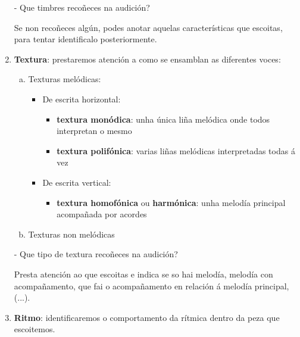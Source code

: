 \begin{enumerate}[1.-]
        \par %
        - Que timbres recoñeces na audición? \dotfill
        \par %
        Se non recoñeces algún, podes anotar aquelas características que escoitas, para tentar identificalo posteriormente.
        \item %
        \textbf{Textura}: prestaremos atención a como se ensamblan as diferentes voces:
            \begin{enumerate}[a)]
                \item Texturas melódicas: 
                \begin{itemize}
                    \item
                    De escrita horizontal: 
                    \begin{itemize}
                        \item 
                        \textbf{textura monódica}: unha única liña melódica onde todos interpretan o mesmo
                        \item
                        \textbf{textura polifónica}: varias liñas melódicas interpretadas todas á vez   
                    \end{itemize}
                    \item
                    De escrita vertical: 
                    \begin{itemize}
                        \item 
                        \textbf{textura homofónica} ou \textbf{harmónica}: unha melodía principal acompañada por acordes
                    \end{itemize}
                \end{itemize}
                \item
                Texturas non melódicas
            \end{enumerate}
            \par %
            - Que tipo de textura recoñeces na audición? \dotfill
            \par %
            Presta atención ao que escoitas e indica se so hai melodía, melodía con acompañamento, que fai o acompañamento en relación á melodía principal, (...).
%
        \item %
        \textbf{Ritmo}: identificaremos o comportamento da rítmica dentro da peza que escoitemos.
        \begin{itemize}

\end{itemize}
\end{enumerate}
